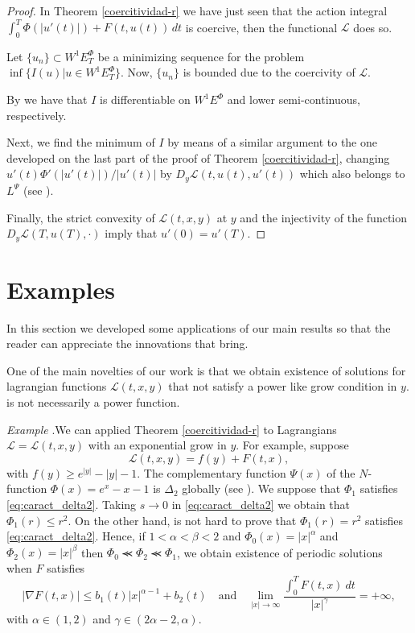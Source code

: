 \documentclass[twoside]{article}
\theoremstyle{remark}
\newcommand{\lpsi}{L^{\Psi}}
\newcommand{\ephi}{E^{\Phi}}
\newcommand{\wphiet}{W^{1}\ephi_T}
\newcommand{\wphie}{W^{1}\ephi}
\renewcommand{\leq}{\leqslant}
\renewcommand{\geq}{\geqslant}
\newcounter{example}
\newenvironment{example}{\noindent\textit{Example} \arabic{example}.}{\addtocounter{example}{1}}
\begin{document}
\begin{proof}
In Theorem \ref{coercitividad-r} we have just seen that the action integral 
$\int_0^T \Phi(|u'(t)|)+F(t,u(t))\,dt$
is coercive, then the functional $\mathcal L$ does so. 

Let $\{u_n\}\subset \wphiet$ be   a  minimizing sequence for the problem  $\inf\{I(u)|u\in\wphiet\}$.
Now, $\{u_n\}$ is bounded due to the coercivity of $\mathcal{L}$. 

By \cite[Thm. 3.2, Lemma 6.1]{ABGMS2015} we have that $I$ is differentiable on $\wphie$ and lower semi-continuous, respectively.

Next, we find the minimum of $I$ by means of a similar argument to the one developed 
on the last part of the proof of Theorem \ref{coercitividad-r}, 
changing  $u'(t)\Phi'(|u'(t)|)/|u'(t)|$ by $D_{y}\mathcal{L}(t,u(t),u'(t))$  which also belongs to $\lpsi$  
(see \cite[Eq. (26)]{ABGMS2015}). 

Finally, the strict convexity of $\mathcal{L}(t,x,y)$ at $y$ and the injectivity of 
the function $D_y\mathcal{L}(T,u(T),\cdot)$ imply that $u'(0)=u'(T)$.
\end{proof}




 \section{Examples}\label{sec:examples}

 In this section we developed some applications of our main results
so that the reader can appreciate the innovations that bring.


One of the main novelties of our work is that we obtain existence of solutions for lagrangian functions $\mathcal{L}(t,x,y)$ that not satisfy a power like grow condition in $y$.   is not necessarily  a power function.

\begin{example}We can applied Theorem \ref{coercitividad-r} to Lagrangians $\mathcal{L}=\mathcal{L}(t,x,y)$ with an exponential grow in $y$. For example, suppose
  \[\mathcal{L}(t,x,y)=f(y)+F(t,x),\]
with $f(y)\geq e^{|y|}-|y|-1$. The complementary
function  $\Psi(x)$ of the $N$-function $\Phi(x)=e^{x}-x-1$ is $\Delta_2$ globally (see \cite[p. 28]{KR}).  We suppose that $\Phi_1$ satisfies \eqref{eq:caract_delta2}. Taking $s\to 0$ in \eqref{eq:caract_delta2} we obtain that $\Phi_1(r)\leq r^2$. On the other hand,  is not hard to prove that $\Phi_1(r)= r^2$ satisfies  \eqref{eq:caract_delta2}. Hence, if $1<\alpha<\beta<2$ and $\Phi_0(x)=|x|^{\alpha}$ and $\Phi_2(x)=|x|^{\beta}$ then $\Phi_0 \llcurly\Phi_2\llcurly\Phi_1$,  we obtain existence of periodic solutions when $F$
satisfies
\[\left| \nabla F(t,x) \right|\leq b_1(t)|x|^{\alpha-1}+b_2(t)\quad\text{and}\quad \lim_{|x|\to\infty}\frac{\int_{0}^{T}F(t,x)\ dt}{|x|^{\gamma}}=+\infty,\]
with $\alpha\in (1,2)$ and $\gamma\in (2\alpha-2,\alpha)$.
\end{example}
\end{document}
